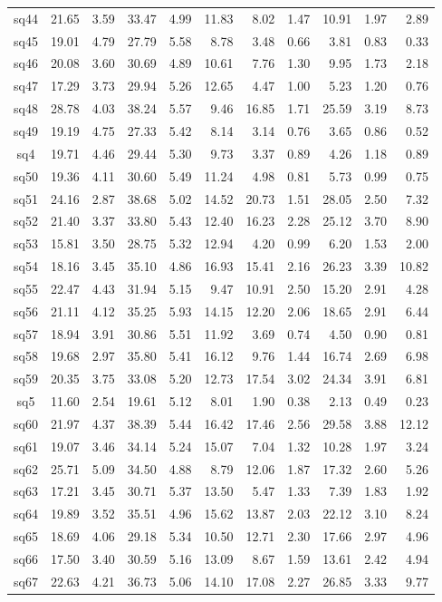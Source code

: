 {\begin{longtable}{@{}cr@{\hspace{1em}}r@{\hspace{1em}}r@{\hspace{1em}}r@{\hspace{1em}}r@{\hspace{2em}}r@{\hspace{1em}}r@{\hspace{1em}}r@{\hspace{1em}}r@{\hspace{1em}}r@{}}
sq44&21.65&3.59&33.47&4.99&11.83&8.02&1.47&10.91&1.97&2.89\\
sq45&19.01&4.79&27.79&5.58&8.78&3.48&0.66&3.81&0.83&0.33\\
sq46&20.08&3.60&30.69&4.89&10.61&7.76&1.30&9.95&1.73&2.18\\
sq47&17.29&3.73&29.94&5.26&12.65&4.47&1.00&5.23&1.20&0.76\\
sq48&28.78&4.03&38.24&5.57&9.46&16.85&1.71&25.59&3.19&8.73\\
sq49&19.19&4.75&27.33&5.42&8.14&3.14&0.76&3.65&0.86&0.52\\
sq4&19.71&4.46&29.44&5.30&9.73&3.37&0.89&4.26&1.18&0.89\\
sq50&19.36&4.11&30.60&5.49&11.24&4.98&0.81&5.73&0.99&0.75\\
sq51&24.16&2.87&38.68&5.02&14.52&20.73&1.51&28.05&2.50&7.32\\
sq52&21.40&3.37&33.80&5.43&12.40&16.23&2.28&25.12&3.70&8.90\\
sq53&15.81&3.50&28.75&5.32&12.94&4.20&0.99&6.20&1.53&2.00\\
sq54&18.16&3.45&35.10&4.86&16.93&15.41&2.16&26.23&3.39&10.82\\
sq55&22.47&4.43&31.94&5.15&9.47&10.91&2.50&15.20&2.91&4.28\\
sq56&21.11&4.12&35.25&5.93&14.15&12.20&2.06&18.65&2.91&6.44\\
sq57&18.94&3.91&30.86&5.51&11.92&3.69&0.74&4.50&0.90&0.81\\
sq58&19.68&2.97&35.80&5.41&16.12&9.76&1.44&16.74&2.69&6.98\\
sq59&20.35&3.75&33.08&5.20&12.73&17.54&3.02&24.34&3.91&6.81\\
sq5&11.60&2.54&19.61&5.12&8.01&1.90&0.38&2.13&0.49&0.23\\
sq60&21.97&4.37&38.39&5.44&16.42&17.46&2.56&29.58&3.88&12.12\\
sq61&19.07&3.46&34.14&5.24&15.07&7.04&1.32&10.28&1.97&3.24\\
sq62&25.71&5.09&34.50&4.88&8.79&12.06&1.87&17.32&2.60&5.26\\
sq63&17.21&3.45&30.71&5.37&13.50&5.47&1.33&7.39&1.83&1.92\\
sq64&19.89&3.52&35.51&4.96&15.62&13.87&2.03&22.12&3.10&8.24\\
sq65&18.69&4.06&29.18&5.34&10.50&12.71&2.30&17.66&2.97&4.96\\
sq66&17.50&3.40&30.59&5.16&13.09&8.67&1.59&13.61&2.42&4.94\\
sq67&22.63&4.21&36.73&5.06&14.10&17.08&2.27&26.85&3.33&9.77\\

\end{longtable}}
